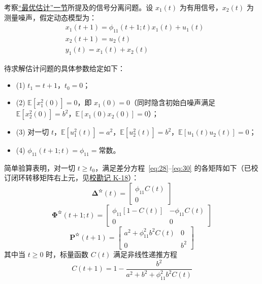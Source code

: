 \begin{example}\label{ex:1}

考察\hyperref[sec:opt]{“最优估计”一节}所提及的信号分离问题。设 $x_1(t)$ 为有用信号，$x_2(t)$ 为测量噪声，假定动态模型为：
\begin{equation*}
\begin{aligned}
&x_1(t + 1) = \phi_{11}(t + 1; t)x_1(t) + u_1(t) \\
&x_2(t + 1) = u_2(t) \\
&y_1(t) = x_1(t) + x_2(t)
\end{aligned}
\end{equation*}

待求解估计问题的具体参数给定如下：

\begin{itemize}
\item (1) $t_1 = t + 1$，$t_0 = 0$；
\item (2) $\mathbb{E}[x_1^2(0)] = 0$，即 $x_1(0) = 0$（同时隐含初始白噪声满足 $\mathbb{E}[x_2^2(0)] = b^2$，$\mathbb{E}[x_1(0)x_2(0)] = 0$）；
\item (3) 对一切 $t$，$\mathbb{E}[u_1^2(t)] = a^2$，$\mathbb{E}[u_2^2(t)] = b^2$，$\mathbb{E}[u_1(t)u_2(t)] = 0$；
\item (4) $\phi_{11}(t + 1; t) = \phi_{11} = \text{常数}$。
\end{itemize}

简单验算表明，对一切 $t \geq t_0$，满足差分方程~\eqref{eq:28}–\eqref{eq:30} 的各矩阵如下（已校订闭环转移矩阵右上元，见\hyperref[sec:k18]{校勘记 K-18}）：
\begin{equation*}
\bm{\Delta}^{\text{✫}}(t) = \begin{bmatrix} \phi_{11}C(t) \\ 0 \end{bmatrix}
\end{equation*}
\begin{equation*}
\bm{\Phi}^{\text{✫}}(t + 1; t) = \begin{bmatrix} \phi_{11}[1 - C(t)] & -\phi_{11}C(t) \\ 0 & 0 \end{bmatrix}
\end{equation*}
\begin{equation*}
\bm{P}^{\text{✫}}(t + 1) = \begin{bmatrix} a^2 + \phi_{11}^2 b^2 C(t) & 0 \\ 0 & b^2 \end{bmatrix}
\end{equation*}
其中当 $t \geq 0$ 时，标量函数 $C(t)$ 满足非线性递推方程
\begin{equation}\label{eq:38}
C(t + 1) = 1 - \frac{b^2}{a^2 + b^2 + \phi_{11}^2 b^2 C(t)}
\end{equation}


\end{example}
